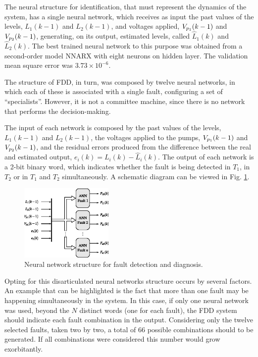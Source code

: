 \documentclass[10pt,fleqn,a4paper]{article}
\begin{document}
The neural structure for identification, that must represent the dynamics of the
system, has a single neural network, which receives as input the past values of
the levels, $L_1(k-1)$ and $L_2 (k-1)$, and voltages applied, $V_{p_{\tiny 1}}
(k-1)$ and $V_{p_{\tiny 2}} (k-1)$, generating, on its output, estimated levels,
called $\widehat{L}_1 (k)$ and $\widehat{L}_2 (k)$.  The best trained neural
network to this purpose was obtained from a second-order model NNARX with eight
neurons on hidden layer. The validation mean square error was $3.73 \times
10^{-6}$.

The structure of FDD, in turn, was composed by twelve neural networks, in which
each of these is associated with a single fault, configuring a set of
``specialists''. However, it is not a committee machine, since there is no
network that performs the decision-making.

The input of each network is composed by the past values of the levels,
$L_1(k-1)$ and $L_2(k-1)$, the voltages applied to the pumps, $V_{p_{\tiny 1}}
(k-1)$ and $V_{p_{\tiny 2}} (k-1)$, and the residual errors produced from the
difference between the real and estimated output, $e_i (k) = L_i (k) -
\widehat{L}_i (k)$. The output of each network is a 2-bit binary word, which
indicates whether the fault is being detected in $T_1$, in $T_2$ or in $T_1$ and
$T_2$ simultaneously. A schematic diagram can be viewed in Fig.
\ref{fig:ann_fdd}.

\begin{figure}[htb]
\centering
    \includegraphics[width=0.4\textwidth]{imgs/ann_fdd}
    \caption{Neural network structure for fault detection and diagnosis.}
    \label{fig:ann_fdd}
\end{figure}

Opting for this disarticulated neural networks structure occurs by several
factors. An example that can be highlighted is the fact that more than one fault
may be happening simultaneously in the system. In this case, if only one neural
network was used, beyond the $N$ distinct words (one for each fault), the FDD
system should indicate each fault combination in the output. Considering only
the twelve selected faults, taken two by two, a total of 66 possible
combinations should to be generated. If all combinations were considered this
number would grow exorbitantly.
\end{document}
